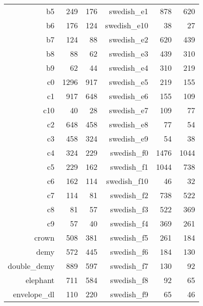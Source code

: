 \begin{figure}
\begin{tabular}{|rrr|rrr|}
                        b5 &    249 &    176 &       swedish\_e1 &    878 &    620 \\
                        b6 &    176 &    124 &      swedish\_e10 &     38 &     27 \\
                        b7 &    124 &     88 &       swedish\_e2 &    620 &    439 \\
                        b8 &     88 &     62 &       swedish\_e3 &    439 &    310 \\
                        b9 &     62 &     44 &       swedish\_e4 &    310 &    219 \\
                        c0 &   1296 &    917 &       swedish\_e5 &    219 &    155 \\
                        c1 &    917 &    648 &       swedish\_e6 &    155 &    109 \\
                       c10 &     40 &     28 &       swedish\_e7 &    109 &     77 \\
                        c2 &    648 &    458 &       swedish\_e8 &     77 &     54 \\
                        c3 &    458 &    324 &       swedish\_e9 &     54 &     38 \\
                        c4 &    324 &    229 &       swedish\_f0 &   1476 &   1044 \\
                        c5 &    229 &    162 &       swedish\_f1 &   1044 &    738 \\
                        c6 &    162 &    114 &      swedish\_f10 &     46 &     32 \\
                        c7 &    114 &     81 &       swedish\_f2 &    738 &    522 \\
                        c8 &     81 &     57 &       swedish\_f3 &    522 &    369 \\
                        c9 &     57 &     40 &       swedish\_f4 &    369 &    261 \\
                     crown &    508 &    381 &       swedish\_f5 &    261 &    184 \\
                      demy &    572 &    445 &       swedish\_f6 &    184 &    130 \\
               double\_demy &    889 &    597 &       swedish\_f7 &    130 &     92 \\
                  elephant &    711 &    584 &       swedish\_f8 &     92 &     65 \\
               envelope\_dl &    110 &    220 &       swedish\_f9 &     65 &     46 \\

\end{tabular}
\end{figure}

